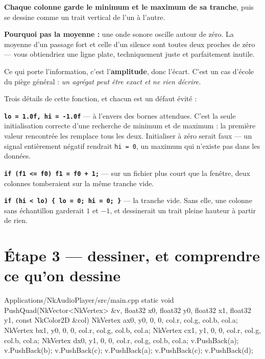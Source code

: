 \begin{nkretenir}
\textbf{Chaque colonne garde le minimum et le maximum de sa tranche}, puis se
dessine comme un trait vertical de l'un à l'autre.

\textbf{Pourquoi pas la moyenne :} une onde sonore oscille autour de zéro. La
moyenne d'un passage fort et celle d'un silence sont toutes deux proches de
zéro --- vous obtiendriez une ligne plate, techniquement juste et parfaitement
inutile.

Ce qui porte l'information, c'est l'\textbf{amplitude}, donc l'écart. C'est un
cas d'école du piège général : \emph{un agrégat peut être exact et ne rien
décrire.}
\end{nkretenir}

\begin{nkpiege}
Trois détails de cette fonction, et chacun est un défaut évité :

\textbf{\texttt{lo = 1.0f, hi = -1.0f}} --- à l'envers des bornes attendues.
C'est la seule initialisation correcte d'une recherche de minimum et de maximum :
la première valeur rencontrée les remplace tous les deux. Initialiser à zéro
serait faux --- un signal entièrement négatif rendrait \texttt{hi = 0}, un
maximum qui n'existe pas dans les données.

\textbf{\texttt{if (f1 <= f0) f1 = f0 + 1;}} --- sur un fichier plus court que la
fenêtre, deux colonnes tomberaient sur la même tranche vide.

\textbf{\texttt{if (hi < lo) \{ lo = 0; hi = 0; \}}} --- la tranche vide. Sans
elle, une colonne sans échantillon garderait $1$ et $-1$, et dessinerait un
trait pleine hauteur à partir de rien.
\end{nkpiege}

\section{Étape 3 --- dessiner, et comprendre ce qu'on dessine}

\begin{nkcode}{Applications/NkAudioPlayer/src/main.cpp}
static void PushQuad(NkVector<NkVertex> &v, float32 x0, float32 y0,
                     float32 x1, float32 y1, const NkColor2D &col) {
    NkVertex a{x0, y0, 0, 0, col.r, col.g, col.b, col.a};
    NkVertex b{x1, y0, 0, 0, col.r, col.g, col.b, col.a};
    NkVertex c{x1, y1, 0, 0, col.r, col.g, col.b, col.a};
    NkVertex d{x0, y1, 0, 0, col.r, col.g, col.b, col.a};
    v.PushBack(a); v.PushBack(b); v.PushBack(c);
    v.PushBack(a); v.PushBack(c); v.PushBack(d);
}
\end{nkcode}

